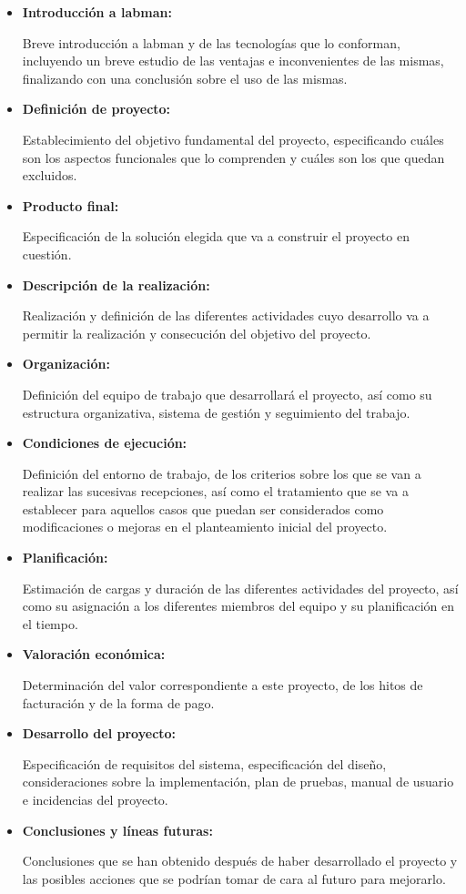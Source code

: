 \begin{itemize}
	\item \textbf{Introducción a \acrshort{labman}:}

	Breve introducción a \acrshort{labman} y de las tecnologías que lo conforman, incluyendo un breve estudio de las ventajas e inconvenientes de las mismas, finalizando con una conclusión sobre el uso de las mismas.

	\item \textbf{Definición de proyecto:}
		
	Establecimiento del objetivo fundamental del proyecto, especificando cuáles son los aspectos funcionales que lo comprenden y cuáles son los que quedan excluidos.
	
	\item \textbf{Producto final:}
		
	Especificación de la solución elegida que va a construir el proyecto en cuestión.
	
	\item \textbf{Descripción de la realización:}

	Realización y definición de las diferentes actividades cuyo desarrollo va a permitir la realización y consecución del objetivo del proyecto.

	\item \textbf{Organización:}
	
	Definición del equipo de trabajo que desarrollará el proyecto, así como su estructura organizativa, sistema de gestión y seguimiento del trabajo.

	\item \textbf{Condiciones de ejecución:}

	Definición del entorno de trabajo, de los criterios sobre los que se van a realizar las sucesivas recepciones, así como el tratamiento que se va a establecer para aquellos casos que puedan ser considerados como modificaciones o mejoras en el planteamiento inicial del proyecto.

	\item \textbf{Planificación:}
	
	Estimación de cargas y duración de las diferentes actividades del proyecto, así como su asignación a los diferentes miembros del equipo y su planificación en el tiempo.

	\item \textbf{Valoración económica:}
	
	Determinación del valor correspondiente a este proyecto, de los hitos de facturación y de la forma de pago.

	\item \textbf{Desarrollo del proyecto:}
	
	Especificación de requisitos del sistema, especificación del diseño, consideraciones sobre la implementación, plan de pruebas, manual de usuario e incidencias del proyecto.

	\item \textbf{Conclusiones y líneas futuras:}

	Conclusiones que se han obtenido después de haber desarrollado el proyecto y las posibles acciones que se podrían tomar de cara al futuro para mejorarlo.
\end{itemize}

